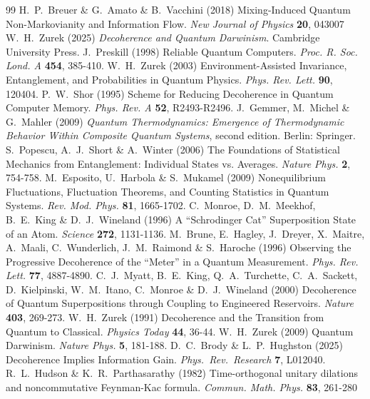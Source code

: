 \documentclass[12pt,a4paper]{article}
\begin{document}
\begin{thebibliography}{99}
%
 H.~P.~Breuer \& G.~Amato \& B.~Vacchini (2018) Mixing-Induced Quantum Non-Markovianity and Information Flow. \textit{New Journal of Physics} {\bf 20}, 043007
%
 W.~H.~Zurek (2025) \textit{Decoherence and Quantum Darwinism}. Cambridge University Press.
%
 J.~Preskill (1998) Reliable Quantum Computers. \textit{Proc. R. Soc. Lond. A} {\bf 454}, 385-410.
%
 W.~H.~Zurek (2003) Environment-Assisted Invariance, Entanglement, and Probabilities in Quantum Physics. \textit{Phys. Rev. Lett.} {\bf 90}, 120404.
%
 P.~W.~Shor (1995) Scheme for Reducing Decoherence in Quantum Computer Memory. \textit{Phys. Rev. A} {\bf 52}, R2493-R2496.
%
 J.~Gemmer, M.~Michel \& G.~Mahler (2009) \textit{Quantum Thermodynamics: Emergence of Thermodynamic Behavior Within Composite Quantum Systems}, second edition. Berlin: Springer.
%
 S.~Popescu, A.~J.~Short \& A.~Winter (2006) The Foundations of Statistical Mechanics from Entanglement: Individual States vs. Averages. \textit{Nature Phys.} {\bf 2}, 754-758.
%
 M.~Esposito, U.~Harbola \& S.~Mukamel (2009) Nonequilibrium Fluctuations, Fluctuation Theorems, and Counting Statistics in Quantum Systems. \textit{Rev. Mod. Phys.} {\bf 81}, 1665-1702.
%
 C.~Monroe, D.~M.~Meekhof, B.~E.~King \& D.~J.~Wineland (1996) A ``Schrodinger Cat'' Superposition State of an Atom. \textit{Science} {\bf 272}, 1131-1136.
%
 M.~Brune, E.~Hagley, J.~Dreyer, X.~Maitre, A.~Maali, C.~Wunderlich, J.~M.~Raimond \& S.~Haroche (1996) Observing the Progressive Decoherence of the ``Meter'' in a Quantum Measurement. \textit{Phys. Rev. Lett.} {\bf 77}, 4887-4890.
%
 C.~J.~Myatt, B.~E.~King, Q.~A.~Turchette, C.~A.~Sackett, D.~Kielpinski, W.~M.~Itano, C.~Monroe \& D.~J.~Wineland (2000) Decoherence of Quantum Superpositions through Coupling to Engineered Reservoirs. \textit{Nature} {\bf 403}, 269-273.
%
 W.~H.~Zurek (1991) Decoherence and the Transition from Quantum to Classical. \textit{Physics Today} {\bf 44}, 36-44.
%
 W.~H.~Zurek (2009) Quantum Darwinism. \textit{Nature Phys.} {\bf 5}, 181-188.
%
 D.~C.~Brody \& L.~P.~Hughston (2025) Decoherence Implies Information Gain. \textit{Phys.~Rev.~Research} {\bf 7}, L012040. 
%
 R.~L.~Hudson \& K.~R.~Parthasarathy (1982) Time-orthogonal unitary dilations and noncommutative Feynman-Kac formula. \textit{Commun. Math. Phys.} {\bf 83}, 261-280

\end{thebibliography}
\end{document}
